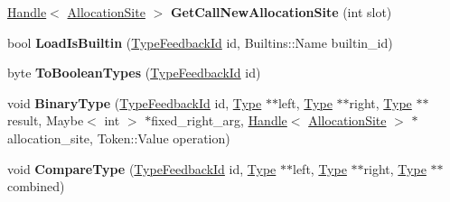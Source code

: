 \begin{DoxyCompactItemize}
\item 
\hypertarget{classv8_1_1internal_1_1_type_feedback_oracle_a63e0fa371ad47a587f0fa94bdb8c5a5e}{}\hyperlink{classv8_1_1internal_1_1_handle}{Handle}$<$ \hyperlink{classv8_1_1internal_1_1_allocation_site}{Allocation\+Site} $>$ {\bfseries Get\+Call\+New\+Allocation\+Site} (int slot)\label{classv8_1_1internal_1_1_type_feedback_oracle_a63e0fa371ad47a587f0fa94bdb8c5a5e}

\item 
\hypertarget{classv8_1_1internal_1_1_type_feedback_oracle_a16f363fb93ba506ef404c2f5af9b5cc5}{}bool {\bfseries Load\+Is\+Builtin} (\hyperlink{classv8_1_1internal_1_1_type_feedback_id}{Type\+Feedback\+Id} id, Builtins\+::\+Name builtin\+\_\+id)\label{classv8_1_1internal_1_1_type_feedback_oracle_a16f363fb93ba506ef404c2f5af9b5cc5}

\item 
\hypertarget{classv8_1_1internal_1_1_type_feedback_oracle_a67bd438341f69f5030580970b667c1c5}{}byte {\bfseries To\+Boolean\+Types} (\hyperlink{classv8_1_1internal_1_1_type_feedback_id}{Type\+Feedback\+Id} id)\label{classv8_1_1internal_1_1_type_feedback_oracle_a67bd438341f69f5030580970b667c1c5}

\item 
\hypertarget{classv8_1_1internal_1_1_type_feedback_oracle_a35406384995a244132cd15e85c6d2200}{}void {\bfseries Binary\+Type} (\hyperlink{classv8_1_1internal_1_1_type_feedback_id}{Type\+Feedback\+Id} id, \hyperlink{classv8_1_1internal_1_1_type_impl}{Type} $\ast$$\ast$left, \hyperlink{classv8_1_1internal_1_1_type_impl}{Type} $\ast$$\ast$right, \hyperlink{classv8_1_1internal_1_1_type_impl}{Type} $\ast$$\ast$result, Maybe$<$ int $>$ $\ast$fixed\+\_\+right\+\_\+arg, \hyperlink{classv8_1_1internal_1_1_handle}{Handle}$<$ \hyperlink{classv8_1_1internal_1_1_allocation_site}{Allocation\+Site} $>$ $\ast$allocation\+\_\+site, Token\+::\+Value operation)\label{classv8_1_1internal_1_1_type_feedback_oracle_a35406384995a244132cd15e85c6d2200}

\item 
\hypertarget{classv8_1_1internal_1_1_type_feedback_oracle_a2240e0d4e848af6e34a89195be298dd4}{}void {\bfseries Compare\+Type} (\hyperlink{classv8_1_1internal_1_1_type_feedback_id}{Type\+Feedback\+Id} id, \hyperlink{classv8_1_1internal_1_1_type_impl}{Type} $\ast$$\ast$left, \hyperlink{classv8_1_1internal_1_1_type_impl}{Type} $\ast$$\ast$right, \hyperlink{classv8_1_1internal_1_1_type_impl}{Type} $\ast$$\ast$combined)\label{classv8_1_1internal_1_1_type_feedback_oracle_a2240e0d4e848af6e34a89195be298dd4}


\end{DoxyCompactItemize}
